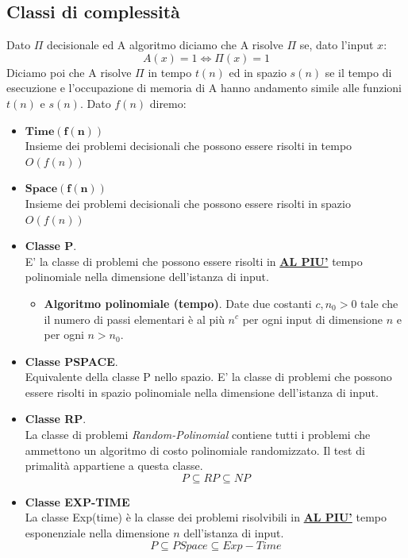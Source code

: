 \subsection{Classi di complessità}
Dato $\Pi$ decisionale ed A algoritmo diciamo che A risolve $\Pi$ se, dato l'input $x$:
$$ A(x) = 1 \Longleftrightarrow \Pi(x) = 1 $$
Diciamo poi che A risolve $\Pi$ in tempo $t(n)$ ed in spazio $s(n)$ se il tempo di esecuzione e l'occupazione di memoria di A hanno andamento simile alle funzioni $t(n)$ e $s(n)$. Dato $f(n)$ diremo:
\begin{itemize}
	\item $\mathbf{Time(f(n))}$ \\
	Insieme dei problemi decisionali che possono essere risolti in tempo $O(f(n))$
	\item $\mathbf{Space(f(n))}$\\
	Insieme dei problemi decisionali che possono essere risolti in spazio $O(f(n))$
	\item \textbf{Classe P}.\\E' la classe di problemi che possono essere risolti in \textbf{\underline{AL PIU'}} tempo polinomiale nella dimensione dell'istanza di input.
	\begin{itemize}
		\item \textbf{Algoritmo polinomiale (tempo)}.
		Date due costanti $c,n_0>0$ tale che il numero di passi elementari è al più $n^c$ per ogni input di dimensione $n$ e per ogni $n>n_0$.
	\end{itemize}
	
	\item \textbf{Classe PSPACE}.\\
	Equivalente della classe P nello spazio. E' la classe di problemi che possono essere risolti in spazio polinomiale nella dimensione dell'istanza di input. 
	
	\item \textbf{Classe RP}.\\La classe di problemi \emph{Random-Polinomial} contiene tutti i problemi che ammettono un algoritmo di costo polinomiale randomizzato. Il test di primalità appartiene a questa classe.
	$$\boxed{P \subseteq RP \subseteq NP} $$
	
	\item \textbf{Classe EXP-TIME}\\
	La classe Exp(time) è la classe dei problemi risolvibili in  \textbf{\underline{AL PIU'}} tempo esponenziale nella dimensione $n$ dell'istanza di input.
	\[P\subseteq PSpace \subseteq Exp-Time\]
	

\end{itemize}
